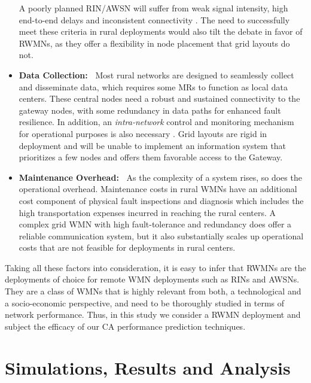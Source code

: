 \documentclass[conference]{IEEEtran}
\begin{document}
\begin{itemize}
 A poorly planned RIN/AWSN will suffer from weak signal intensity, high end-to-end delays and inconsistent connectivity \cite{GridRural2}. The need to successfully meet these criteria in rural deployments would also tilt the debate in favor of RWMNs, as they offer a flexibility in node placement that grid layouts do not.  
  \item \textbf{Data Collection:~} Most rural networks are designed to seamlessly collect and disseminate data, which requires some MRs to function as local data centers. These central nodes need a robust and sustained connectivity to the gateway nodes, with some redundancy in data paths for enhanced fault resilience. In addition, an \textit{intra-network} control and monitoring mechanism for operational purposes is also necessary \cite{GridRural}. Grid layouts are rigid in deployment and will be unable to implement an information system that prioritizes a few nodes and offers them favorable access to the Gateway. 
   \item \textbf{Maintenance Overhead:~} As the complexity of a system rises, so does the operational overhead. Maintenance costs in rural WMNs have an additional cost component of physical fault inspections and diagnosis which includes the high transportation expenses incurred in reaching the rural centers. A complex grid WMN with high fault-tolerance and redundancy does offer a reliable communication system, but it also substantially scales up operational costs that are not feasible for deployments in rural centers.
\end{itemize}

Taking all these factors into consideration, it is easy to infer that RWMNs are the deployments of choice for remote WMN deployments such as RINs and AWSNs. They are a class of WMNs that is highly relevant from both, a technological and a socio-economic perspective, and need to be thoroughly studied in terms of network performance. Thus, in this study we consider a RWMN deployment and subject the efficacy of our CA performance prediction techniques. 
\section{Simulations, Results and Analysis}
\end{document}
